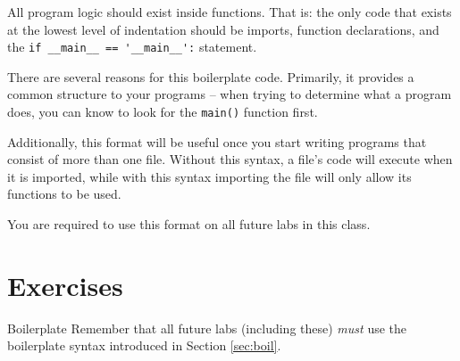 \documentclass[11pt]{cselabheader}
\begin{document}
All program logic should exist inside functions. That is: the only code that exists at the lowest level of indentation should be imports, function declarations, and the \lstinline{if __main__ == '__main__':} statement.

There are several reasons for this boilerplate code. Primarily, it provides a common structure to your programs -- when trying to determine what a program does, you can know to look for the \lstinline{main()} function first.

Additionally, this format will be useful once you start writing programs that consist of more than one file. Without this syntax, a file's code will execute when it is imported, while with this syntax importing the file will only allow its functions to be used.

You are required to use this format on all future labs in this class.


\section{Exercises}
\label{sec:ex}

\begin{warningbox}{Boilerplate}
  Remember that all future labs (including these) \emph{must} use the boilerplate syntax introduced in Section \ref{sec:boil}.
\end{warningbox}
\end{document}

